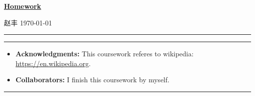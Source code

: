 \documentclass[a4paper]{article}
\begin{document}

\setcounter{hwcnt}{5} %

\begin{center}
  \underline{\bf Homework \thehwcnt} \\
\end{center}
\begin{flushleft}
  赵丰\hfill
  \today
\end{flushleft}
\hrule

\vspace{2em}

\flushleft
\rule{\textwidth}{1pt}
\begin{itemize}
\item {\bf Acknowledgments: \/} 
  This coursework referes to wikipedia: \small{\url{https://en.wikipedia.org}}.

\item {\bf Collaborators: \/}
  I finish this coursework by myself.
\end{itemize}
\rule{\textwidth}{1pt}

\vspace{2em}
\end{document}
